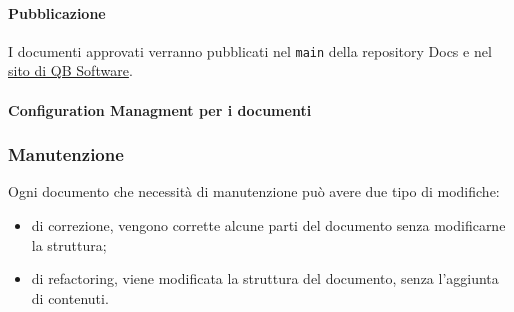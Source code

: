 		\paragraph{Pubblicazione}
			I documenti approvati verranno pubblicati nel \verb|main| della repository Docs e nel \href{https://qb-software-swe.github.io/docs/site/index.html}{sito di QB Software}.

        \paragraph{Configuration Managment per i documenti} \label{sec:doc_CM}

    \subsubsection{Manutenzione} \label{sec:doc_maintenance}
        Ogni documento che necessità di manutenzione può avere due tipo di modifiche:
        \begin{itemize}
            \item di correzione, vengono corrette alcune parti del documento senza modificarne la struttura;
            \item di refactoring, viene modificata la struttura del documento, senza l'aggiunta di contenuti.
        \end{itemize}